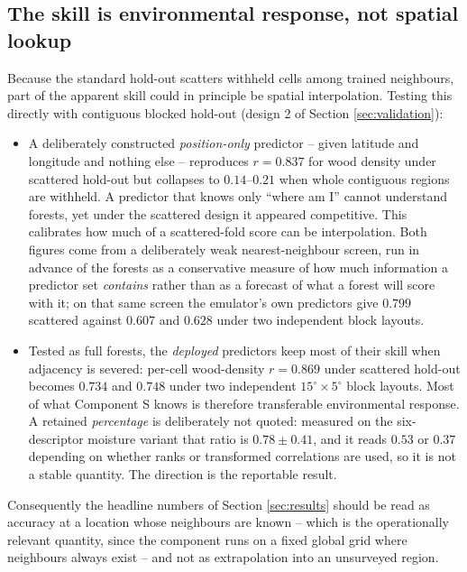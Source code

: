 \documentclass[11pt]{article}
\begin{document}
\subsection{The skill is environmental response, not spatial lookup}

Because the standard hold-out scatters withheld cells among trained neighbours, part of the apparent skill could in principle be spatial interpolation. Testing this directly with contiguous blocked hold-out (design 2 of Section \ref{sec:validation}):

\begin{itemize}[leftmargin=1.4em]
\item A deliberately constructed \emph{position-only} predictor -- given latitude and longitude and nothing else -- reproduces $r = 0.837$ for wood density under scattered hold-out but collapses to $0.14$--$0.21$ when whole contiguous regions are withheld. A predictor that knows only ``where am I'' cannot understand forests, yet under the scattered design it appeared competitive. This calibrates how much of a scattered-fold score can be interpolation. Both figures come from a deliberately weak nearest-neighbour screen, run in advance of the forests as a conservative measure of how much information a predictor set \emph{contains} rather than as a forecast of what a forest will score with it; on that same screen the emulator's own predictors give $0.799$ scattered against $0.607$ and $0.628$ under two independent block layouts.
\item Tested as full forests, the \emph{deployed} predictors keep most of their skill when adjacency is severed: per-cell wood-density $r = 0.869$ under scattered hold-out becomes $0.734$ and $0.748$ under two independent $15^\circ \times 5^\circ$ block layouts. Most of what Component S knows is therefore transferable environmental response. A retained \emph{percentage} is deliberately not quoted: measured on the six-descriptor moisture variant that ratio is $0.78 \pm 0.41$, and it reads $0.53$ or $0.37$ depending on whether ranks or transformed correlations are used, so it is not a stable quantity. The direction is the reportable result.
\end{itemize}

Consequently the headline numbers of Section \ref{sec:results} should be read as accuracy at a location whose neighbours are known -- which is the operationally relevant quantity, since the component runs on a fixed global grid where neighbours always exist -- and not as extrapolation into an unsurveyed region.
\end{document}
